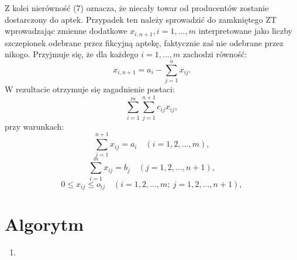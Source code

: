 \documentclass[11pt]{article}
\begin{document}
Z kolei nierówność (7) oznacza, że niecały towar od producentów zostanie dostarczony do aptek. Przypadek ten należy sprowadzić do zamkniętego ZT wprowadzając zmienne dodatkowe $x_{i,n+1}, i = 1,..., m$ interpretowane jako liczby szczepionek odebrane przez fikcyjną aptekę, faktycznie zaś nie odebrane przez nikogo. Przyjmuje się, że dla każdego $i=1,..., m$ zachodzi równość:
\begin{equation}
    x_{i,n+1}=a_{i}-\sum\limits_{j=1}^{n} x_{ij}.
\end{equation}
W rezultacie otrzymuje się zagadnienie postaci:
\begin{equation}
    \sum\limits_{i=1}^{m}\sum\limits_{j=1}^{n+1}c_{ij}x_{ij},
\end{equation}
przy warunkach:
\begin{equation}
    \sum\limits_{j=1}^{n+1} x_{ij} = a_{i} \quad (i = 1, 2,..., m),
\end{equation}
\begin{equation}
    \sum\limits_{i=1}^{m} x_{ij} = b_{j} \quad (j = 1, 2,..., n+1),
\end{equation}
\begin{equation}
    0 \leq x_{ij} \leq o_{ij} \quad (i = 1, 2,..., m; \ j = 1, 2,..., n+1),
\end{equation}

\section{Algorytm}
\begin{enumerate}
    \item 
\end{enumerate}
\end{document}
